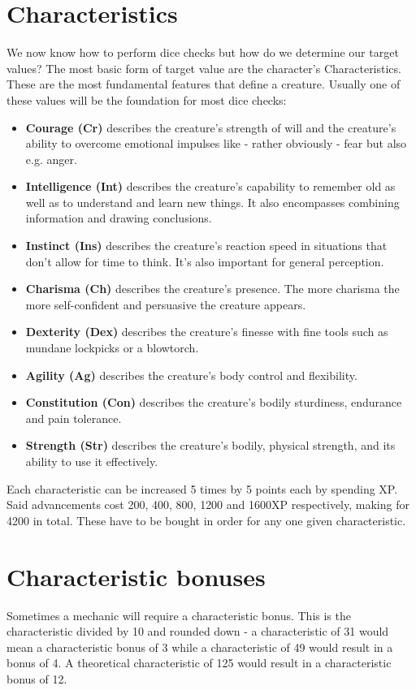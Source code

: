 \documentclass[12pt,a4paper,openany,dvipsnames]{book}
\begin{document}
	\section{Characteristics}
	We now know how to perform dice checks but how do we determine our target values?
	The most basic form of target value are the character’s Characteristics.
	These are the most fundamental features that define a creature.
	Usually one of these values will be the foundation for most dice checks:
	\begin{itemize}
		\setlength\itemsep{-8mm}
		\item \textbf{Courage (Cr)} describes the creature’s strength of will
			and the creature’s ability to overcome emotional impulses like
			- rather obviously - fear but also e.g. anger.
		\item \textbf{Intelligence (Int)} describes the creature’s capability to remember old as well as to understand and learn new things.
			It also encompasses combining information and drawing conclusions.
		\item \textbf{Instinct (Ins)} describes the creature’s reaction speed in situations that don’t allow for time to think.
			It's also important for general perception.
		\item \textbf{Charisma (Ch)} describes the creature’s presence. The more charisma the more self-confident and persuasive the creature appears.
		\item \textbf{Dexterity (Dex)} describes the creature’s finesse with fine tools such as mundane lockpicks or a blowtorch.
		\item \textbf{Agility (Ag)} describes the creature’s body control and flexibility.
		\item \textbf{Constitution (Con)} describes the creature’s bodily sturdiness, endurance and pain tolerance.
		\item \textbf{Strength (Str)} describes the creature’s bodily, physical strength,
			and its ability to use it effectively.
	\end{itemize}
	Each characteristic can be increased 5 times by 5 points each by spending XP. Said advancements cost 200, 400, 800, 1200 and 1600XP respectively, making for 4200 in total. These have to be bought in order for any one given characteristic.

	\begin{minipage}{\columnwidth}
	\section{Characteristic bonuses}
	Sometimes a mechanic will require a characteristic bonus. This is the characteristic divided by 10 and rounded down - a characteristic of 31 would mean a characteristic bonus of 3 while a characteristic of 49 would result in a bonus of 4. A theoretical characteristic of 125 would result in a characteristic bonus of 12.
	\end{minipage}
\end{document}
